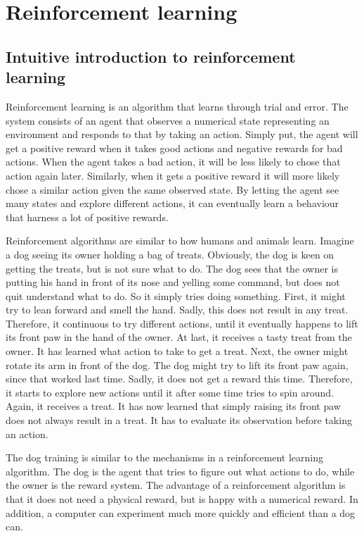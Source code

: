 \documentclass[class=book, crop=false]{standalone}
\begin{document}
\chapter{Reinforcement learning}
\section{Intuitive introduction to reinforcement learning}
Reinforcement learning is an algorithm that learns through trial and error. The system consists of an agent that observes a numerical state representing an environment and responds to that by taking an action. Simply put, the agent will get a positive reward when it takes good actions and negative rewards for bad actions. When the agent takes a bad action, it will be less likely to chose that action again later. Similarly, when it gets a positive reward it will more likely chose a similar action given the same observed state. By letting the agent see many states and explore different actions, it can eventually learn a behaviour that harness a lot of positive rewards. 

Reinforcement algorithms are similar to how humans and animals learn. Imagine a dog seeing its owner holding a bag of treats. Obviously, the dog is keen on getting the treats, but is not sure what to do. The dog sees that the owner is putting his hand in front of its nose and yelling some command, but does not quit understand what to do. So it simply tries doing something. First, it might try to lean forward and smell the hand. Sadly, this does not result in any treat. Therefore, it continuous to try different actions, until it eventually happens to lift its front paw in the hand of the owner. At last, it receives a tasty treat from the owner. It has learned what action to take to get a treat. Next, the owner might rotate its arm in front of the dog. The dog might try to lift its front paw again, since that worked last time. Sadly, it does not get a reward this time. Therefore, it starts to explore new actions until it after some time tries to spin around. Again, it receives a treat. It has now learned that simply raising its front paw does not always result in a treat. It has to evaluate its observation before taking an action. 

The dog training is similar to the mechanisms in a reinforcement learning algorithm. The dog is the agent that tries to figure out what actions to do, while the owner is the reward system. The advantage of a reinforcement algorithm is that it does not need a physical reward, but is happy with a numerical reward. In addition, a computer can experiment much more quickly and efficient than a dog can. 
\end{document}
